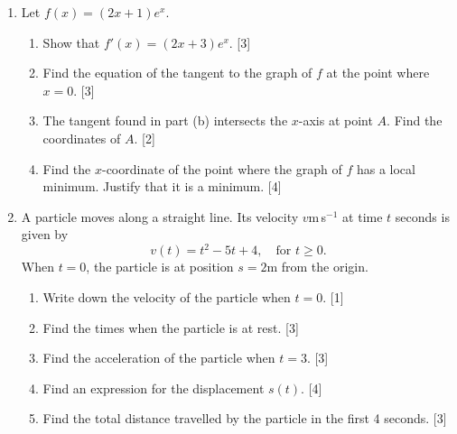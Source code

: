 \documentclass[12pt, twoside]{article}
\begin{document}
\begin{enumerate}[itemsep=0.2cm]
\begin{enumerate}[itemsep=0.15cm]
        Find $g(x)$. \hfill [4]
\end{enumerate}


\newpage

\item Let $f(x) = (2x + 1)e^x$.

\begin{enumerate}[itemsep=0.15cm]
  \item Show that $f'(x) = (2x + 3)e^x$. \hfill [3]
  \item Find the equation of the tangent to the graph of $f$ at the point
        where $x = 0$. \hfill [3]
  \item The tangent found in part (b) intersects the $x$-axis at point $A$.
        Find the coordinates of $A$. \hfill [2]
  \item Find the $x$-coordinate of the point where the graph of $f$ has a
        local minimum. Justify that it is a minimum. \hfill [4]
\end{enumerate}


\newpage

\item A particle moves along a straight line. Its velocity $v$\;m\,s$^{-1}$ at time
$t$ seconds is given by
\[v(t) = t^2 - 5t + 4, \quad \text{for } t \geq 0.\]
When $t = 0$, the particle is at position $s = 2$\;m from the origin.

\begin{enumerate}[itemsep=0.15cm]
  \item Write down the velocity of the particle when $t = 0$. \hfill [1]
  \item Find the times when the particle is at rest. \hfill [3]
  \item Find the acceleration of the particle when $t = 3$. \hfill [3]
  \item Find an expression for the displacement $s(t)$. \hfill [4]
  \item Find the total distance travelled by the particle in the first
        4 seconds. \hfill [3]
\end{enumerate}



\end{enumerate}
\end{document}
